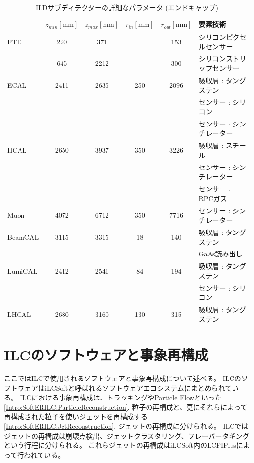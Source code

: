 \begin{table}[htb]
 \centering
　\small
  \begin{tabular}{l c c c c l} \hline
     & $z_{min} \mathrm{[mm]}$ & $z_{max} \mathrm{[mm]}$ & $r_{in} \mathrm{[mm]}$ & $r_{out} \mathrm{[mm]}$ & 要素技術\\ \hline \hline
    FTD & 220 & 371 & & 153 & シリコンピクセルセンサー\\
            & 645 & 2212 & & 300 & シリコンストリップセンサー\\ \hline
    ECAL & 2411 & 2635 & 250 & 2096 & 吸収層 : タングステン\\
    &&&&& センサー : シリコン\\
    &&&&& センサー : シンチレーター\\
    HCAL & 2650 & 3937 & 350 & 3226 & 吸収層 : スチール\\
    &&&&& センサー : シンチレーター\\
    &&&&& センサー : RPCガス\\
    Muon & 4072 & 6712 & 350 & 7716 & センサー : シンチレーター\\ \hline
    BeamCAL & 3115 & 3315 & 18 & 140 & 吸収層 : タングステン\\
    &&&&& GaAs読み出し \\
    LumiCAL & 2412 & 2541 & 84 & 194 & 吸収層 : タングステン\\
    &&&&& センサー : シリコン\\
    LHCAL & 2680 & 3160 & 130 & 315 &吸収層 : タングステン\\ \hline
  \end{tabular}
  \caption{ILDサブディテクターの詳細なパラメータ (エンドキャップ) \cite{InterimDesignReport}}
  \label{ILDSubdetectorParametersEndCap}
\end{table}

\section{ILCのソフトウェアと事象再構成} \label{Intro:SoftwareandEventReconstructionofILC}

ここではILCで使用されるソフトウェアと事象再構成について述べる。
ILCのソフトウェアはiLCSoft\cite{iLCSoft}と呼ばれるソフトウェアエコシステムにまとめられている。
ILCにおける事象再構成は、トラッキングやParticle Flowといった\ref{Intro:SoftERILC:ParticleReconstruction}. 粒子の再構成と、更にそれらによって再構成された粒子を使いジェットを再構成する\ref{Intro:SoftERILC:JetReconstruction}. ジェットの再構成に分けられる。
ILCではジェットの再構成は崩壊点検出、ジェットクラスタリング、フレーバータギングという行程に分けられる。
これらジェットの再構成はiLCSoft内のLCFIPlus\cite{LCFIPlus}によって行われている。

